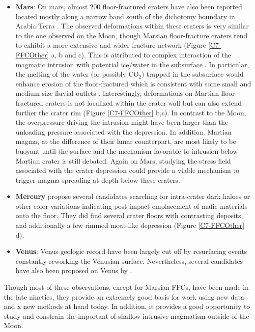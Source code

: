 \begin{itemize}
\item  \textbf{Mars}: On  mars, almost  $200$ floor-fractured  craters
  have also been reported located mostly  along a narrow band south of
  the dichotomy boundary in  Arabia Terra \citep{Bamberg:2014hb}.  The
  observed deformations  within these craters  is very similar  to the
  one observed on the Moon, though Marsian floor-fracture craters tend
  to  exhibit a  more  extensive and  wider  fracture network  (Figure
  \ref{C7-FFCOther}  a,  b and  c).   This  is attributed  to  complex
  interaction of  the magmatic  intrusion with potential  ice/water in
  the  subsurface  \citep{Sato:2010ex,Bamberg:2014hb}. In  particular,
  the  melting  of the  water  (or  possibly  CO$_2$) trapped  in  the
  subsurface  would enhance  erosion of  the floor-fractured  which is
  consistent  with   some  small  and  medium   size  fluvial  outlets
  \citep{Sato:2010ex}.    Interestingly,   deformations   on   Martian
  floor-fractured craters is not localized  within the crater wall but
  can  also extend  further the  crater rim  (Figure \ref{C7-FFCOther}
  b,c).   In  contrast  to  the Moon,  the  overpressure  driving  the
  intrusion  might  have  been  larger  than  the  unloading  pressure
  associated with the depression.  In  addition, Martian magma, at the
  difference of their lunar counterpart, are most likely to be buoyant
  until the  surface and  the mechanism  favorable to  intrusion below
  Martian crater is still debated.  Again on Mars, studying the stress
  field associated with  the crater depression could  provide a viable
  mechanism to trigger magma spreading at depth below these craters.

\item   \textbf{Mercury}    \citet{Schultz:1977ec}   propose   several
  candidates  searching for  intra-crater dark  haloes or  other color
  variations  indicating post-impact  emplacement  of mafic  materials
  onto  the  floor.    They  did  find  several   crater  floors  with
  contrasting  deposits,  and  additionally  a  few  rimmed  moat-like
  depression (Figure \ref{C7-FFCOther} d).
  
\item \textbf{Venus}: Venus geologic record  have been largely cut off
  by  resurfacing events  constantly reworking  the Venusian  surface.
  Nevertheless, several candidates have also been proposed on Venus by
  \citet{Wichman:1995ju}.
\end{itemize}

Though most of these observations,  except for Marsian FFCs, have been
made in  the late nineties, they  provide an extremely good  basis for
work using new data  and x new methods at hand  today. In addition, it
provides a  good opportunity to  study and constrain the  important of
shallow intrusive magmatism outside of the Moon.






